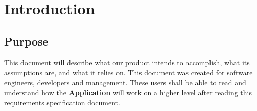 \documentclass[english]{article}
\begin{document}
\vspace*{\fill} 
\vspace*{\fill} 

\newpage

\tableofcontents

\newpage

\setcounter{page}{1}
\raggedright

\section{Introduction}
\label{sec:introduction}

\subsection{Purpose}
\label{sub:purpose}
This document will describe what our product intends to accomplish, what its assumptions are, and what it relies on. This document was created for software engineers, developers and management. These users shall be able to read and understand how the \textbf{Application} will work on a higher level after reading this requirements specification document.
\end{document}
